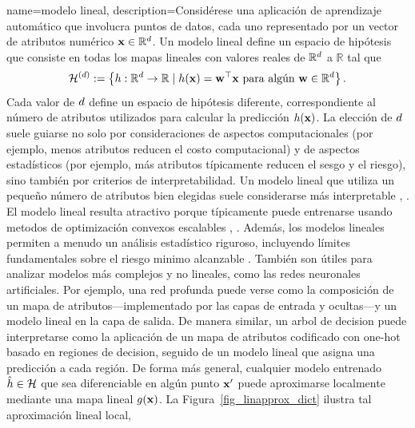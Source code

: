 {name={modelo lineal}, 
	description={Considérese una aplicación de aprendizaje automático que involucra puntos de datos, cada uno representado 
		por un vector de atributos numérico ${\bf x} \in \mathbb{R}^{d}$. Un modelo lineal define 
		un espacio de hipótesis que consiste en todas los mapas lineales con valores reales de $\mathbb{R}^{d}$ a $\mathbb{R}$ tal que
		\begin{equation}
			\label{equ_def_lin_model_hypspace_dict}
			\mathcal{H}^{(d)} := \left\{ h: \mathbb{R}^{d} \rightarrow \mathbb{R} \mid h({\bf x}) = {\bf w}^{\top} {\bf x} \text{ para algún } {\bf w} \in \mathbb{R}^{d} \right\}.
		\end{equation}
		Cada valor de $d$ define un espacio de hipótesis diferente, correspondiente al número de 
		atributos utilizados para calcular la predicción $h({\bf x})$. La elección de 
		$d$ suele guiarse no solo por consideraciones de aspectos computacionales (por ejemplo, menos atributos reducen el costo computacional) y 
		de aspectos estadísticos (por ejemplo, más atributos típicamente reducen el sesgo y el riesgo), sino también por criterios de interpretabilidad. 
		Un modelo lineal que utiliza un pequeño número de atributos bien elegidas suele considerarse 
		más interpretable \cite{rudin2019stop}, \cite{Ribeiro2016}.
		El modelo lineal resulta atractivo porque típicamente puede entrenarse usando metodos de optimización convexos escalables \cite{hastie01statisticallearning}, \cite{BertsekasNonLinProgr}. 
		Además, los modelos lineales permiten a menudo un análisis estadístico riguroso, incluyendo límites fundamentales sobre el riesgo minimo alcanzable \cite{Wain2019}. 
		También son útiles para analizar modelos más complejos y no lineales, como las redes neuronales artificiales. Por ejemplo, 
		una red profunda puede verse como la composición de un mapa de atributos—implementado por las capas de entrada y 
		ocultas—y un modelo lineal en la capa de salida. De manera similar, un arbol de decision puede interpretarse 
		como la aplicación de un mapa de atributos codificado con one-hot basado en regiones de decision, seguido de un modelo
		lineal que asigna una predicción a cada región.
		De forma más general, cualquier modelo entrenado $\hat{h} \in \mathcal{H}$ que sea 
		diferenciable en algún punto ${\bf x}'$ puede aproximarse localmente mediante una mapa lineal 
		$g({\bf x})$. La Figura~\ref{fig_linapprox_dict} ilustra tal aproximación lineal local, 
}}
